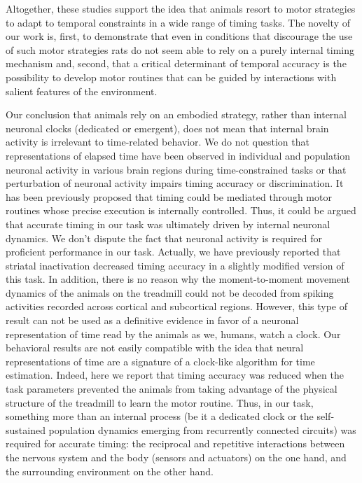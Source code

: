 Altogether, these studies support the idea that animals resort to motor strategies to adapt to temporal constraints in a wide range of timing tasks.
The novelty of our work is, first, to demonstrate that even in conditions that discourage the use of such motor strategies rats do not seem able to rely on a purely internal timing mechanism and, second, that a critical determinant of temporal accuracy is the possibility to develop motor routines that can be guided by interactions with salient features of the environment.
\par
Our conclusion that animals rely on an embodied strategy, rather than internal neuronal clocks (dedicated or emergent), does not mean that internal brain activity is irrelevant to time-related behavior.
We do not question that representations of elapsed time have been observed in individual and population neuronal activity in various brain regions during time-constrained tasks or that perturbation of neuronal activity impairs timing accuracy or discrimination.
It has been previously proposed that timing could be mediated through motor routines whose precise execution is internally controlled\cite{Killeen1988,Dragoi2003, Staddon1999,Machado1997}.
Thus, it could be argued that accurate timing in our task was ultimately driven by internal neuronal dynamics.
We don't dispute the fact that neuronal activity is required for proficient performance in our task.
Actually, we have previously reported that striatal inactivation decreased timing accuracy in a slightly modified version of this task\cite{Rueda2015NatNeuro}.
In addition, there is no reason why the moment-to-moment movement dynamics of the animals on the treadmill could not be decoded from spiking activities recorded across cortical and subcortical regions.
However, this type of result can not be used as a definitive evidence in favor of a neuronal representation of time read by the animals as we, humans, watch a clock\cite{Krakauer2017Neuron, Buzsaki2017Science, Buzsaki2018TICS}.
Our behavioral results are not easily compatible with the idea that neural representations of time are a signature of a clock-like algorithm for time estimation.
Indeed, here we report that timing accuracy was reduced when the task parameters prevented the animals from taking advantage of the physical structure of the treadmill to learn the motor routine.
Thus, in our task, something more than an internal process (be it a dedicated clock or the self-sustained population dynamics emerging from recurrently connected circuits)  was required for accurate timing:
the reciprocal and repetitive interactions between the nervous system and the body (sensors and actuators) on the one hand, and the surrounding environment on the other hand.
